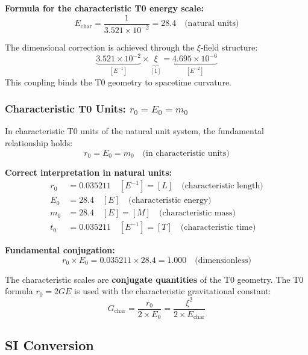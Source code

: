 	\textbf{Formula for the characteristic T0 energy scale:}
	\begin{equation}
		\boxed{E_{\text{char}} = \frac{1}{3.521 \times 10^{-2}} = 28.4 \quad \text{(natural units)}}
	\end{equation}
	
	The dimensional correction is achieved through the $\xi$-field structure:
	\begin{equation}
		\underbrace{3.521 \times 10^{-2}}_{[E^{-1}]} \times \underbrace{\xi}_{[1]} = \underbrace{4.695 \times 10^{-6}}_{[E^{-2}]}
	\end{equation}
	This coupling binds the T0 geometry to spacetime curvature.
	
	\subsubsection{Characteristic T0 Units: $r_0 = E_0 = m_0$}
	
	In characteristic T0 units of the natural unit system, the fundamental relationship holds:
	\begin{equation}
		r_0 = E_0 = m_0 \quad \text{(in characteristic units)}
	\end{equation}
	
	\textbf{Correct interpretation in natural units:}
	\begin{align}
		r_0 &= 0.035211 \quad [E^{-1}] = [L] \quad \text{(characteristic length)} \\
		E_0 &= 28.4 \quad [E] \quad \text{(characteristic energy)} \\
		m_0 &= 28.4 \quad [E] = [M] \quad \text{(characteristic mass)} \\
		t_0 &= 0.035211 \quad [E^{-1}] = [T] \quad \text{(characteristic time)}
	\end{align}
	
	\textbf{Fundamental conjugation:}
	\begin{equation}
		r_0 \times E_0 = 0.035211 \times 28.4 = 1.000 \quad \text{(dimensionless)}
	\end{equation}
	
	The characteristic scales are \textbf{conjugate quantities} of the T0 geometry. The T0 formula $r_0 = 2GE$ is used with the characteristic gravitational constant:
	\begin{equation}
		G_{\text{char}} = \frac{r_0}{2 \times E_0} = \frac{\xi^2}{2 \times E_{\text{char}}}
	\end{equation}
	
	\subsection{SI Conversion}
	
